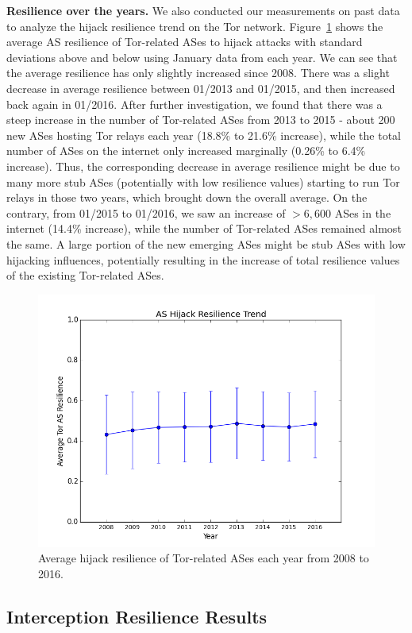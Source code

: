 {\bf Resilience over the years.} We also conducted our measurements on past data to analyze the hijack resilience trend on the Tor network.  Figure~\ref{fig:resilience_trend} shows the average AS resilience of Tor-related ASes to hijack attacks with standard deviations above and below using January data from each year.  We can see that the average resilience has only slightly increased since 2008.  There was a slight decrease in average resilience between 01/2013 and 01/2015, and then increased back again in 01/2016. After further investigation, we found that there was a steep increase in the number of Tor-related ASes from 2013 to 2015 - about 200 new ASes hosting Tor relays each year (18.8\% to 21.6\% increase), while the total number of ASes on the internet only increased marginally (0.26\% to 6.4\% increase). Thus, the corresponding decrease in average resilience might be due to many more stub ASes (potentially with low resilience values) starting to run Tor relays in those two years, which brought down the overall average. On the contrary, from 01/2015 to 01/2016, we saw an increase of $>6,600$ ASes in the internet (14.4\% increase), while the number of Tor-related ASes remained almost the same. A large portion of the new emerging ASes might be stub ASes with low hijacking influences, potentially resulting in the increase of total resilience values of the existing Tor-related ASes. 

\begin{figure}[ht!]
\centering
\includegraphics[width=.4\textwidth]{new_longitudinal}
\caption{Average hijack resilience of Tor-related ASes each year from 2008 to 2016.}
\label{fig:resilience_trend}
\end{figure}

\subsection{Interception Resilience Results}


